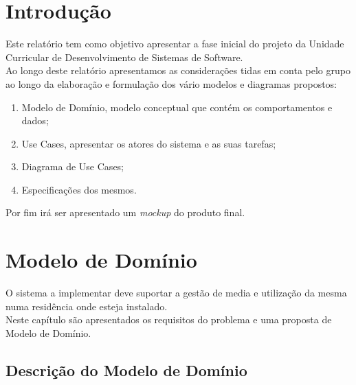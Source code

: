 \documentclass[a4paper]{report}
\begin{document}
\pagebreak

\chapter{Introdução}

Este relatório tem como objetivo apresentar a fase inicial do projeto da Unidade
Curricular de Desenvolvimento de Sistemas de Software.\\
Ao longo deste relatório apresentamos as considerações tidas em conta pelo grupo
ao longo da elaboração e formulação dos vário modelos e diagramas propostos:
\begin{enumerate}
    \item Modelo de Domínio, modelo conceptual que contém os
        comportamentos e dados;
    \item Use Cases, apresentar os atores do sistema e as suas tarefas;
    \item Diagrama de Use Cases;
    \item Especificações dos mesmos.
\end{enumerate}
Por fim irá ser apresentado um \textit{mockup} do produto final.

\chapter{Modelo de Domínio}

O sistema a implementar deve suportar a gestão de media e utilização da mesma
numa residência onde esteja instalado.\\
Neste capítulo são apresentados os requisitos do problema e uma proposta de 
Modelo de Domínio.

\section{Descrição do Modelo de Domínio}
\end{document}
